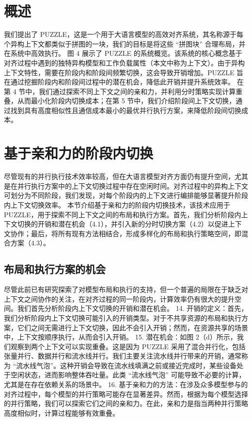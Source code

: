 \section{概述}
我们提出了 PUZZLE，这是一个用于大语言模型的高效对齐系统，其名称源于每个异构上下文都类似于拼图的一块，我们的目标是将这些 “拼图块” 合理布局，并在系统中高效执行。 
图 4 展示了 PUZZLE 的系统概览。该系统的核心概念基于对齐过程中遇到的独特异构模型和工作负载属性（本文中称为上下文）。由于异构上下文特性，需要在阶段内和阶段间频繁切换，这会导致开销增加。PUZZLE 旨在通过挖掘阶段内和阶段间过程中的潜在机会，降低此开销并提升系统效率。 
在第 4 节中，我们通过探索不同上下文之间的亲和力，并利用分时策略实现计算重叠，从而最小化阶段内切换成本；在第 5 节中，我们介绍阶段间上下文切换，通过找到具有高度相似性且通信成本最小的最优并行执行方案，来降低阶段间切换成本。 
\section{基于亲和力的阶段内切换}
尽管现有的并行执行技术效率较高，但在大语言模型对齐方面仍有提升空间，尤其是在并行执行方案中的上下文切换过程中存在空闲时间。对齐过程中的异构上下文可划分为不同阶段，我们发现，对每个阶段内的上下文进行编排能够显著提升阶段内上下文切换效率。 
本节介绍基于亲和力的阶段内切换技术，该技术应用于 PUZZLE，用于探索不同上下文之间的布局和执行方案。首先，我们分析阶段内上下文切换的开销和潜在机会（4.1），并引入新的分时切换方案（4.2）以促进上下文协作；最后，将所有现有方法相结合，形成多样化的布局和执行策略空间，即混合方案（4.3）。 
\subsection{布局和执行方案的机会}
尽管此前已有研究探索了对模型布局和执行的支持，但一个普遍的局限在于缺乏对上下文之间协作的关注，在对齐过程的同一阶段内，计算效率仍有很大的提升空间。我们首先分析阶段内上下文切换的开销和潜在机会。 
14.	开销的定义：首先，我们分析阶段内上下文切换可能引入的开销类型。对于不共享资源的布局和执行方案，它们之间无需进行上下文切换，因此不会引入开销；然而，在资源共享的场景中，上下文按顺序执行，从而会引入开销。 
15.	潜在机会：如图 2（d）所示，我们观察到两个上下文可以实现重叠。这是因为 PUZZLE 采用了混合并行化，包括张量并行、数据并行和流水线并行。我们主要关注流水线并行带来的开销，通常称为 “流水线气泡”。这种开销会导致在流水线填满之前或接近完成时，某些设备处于空闲状态，进而影响整体吞吐量。此类 “流水线气泡” 可能导致不必要的计算，尤其是在存在依赖关系的场景中。 
16.	基于亲和力的方法：在涉及众多模型参与的对齐过程中，每个模型的并行策略可能存在显著差异。然而，根据为每个模型选择的并行策略，我们可以探索它们之间的亲和力。在此，亲和力是指当两种并行策略高度相似时，计算过程能够有效重叠。 
